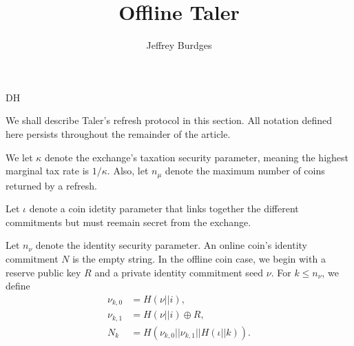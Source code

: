 \documentclass{llncs}
\title{Offline Taler}
\def\mathcomma{,}
\def\mathperiod{.}
\begin{document}
\mainmatter

\author{Jeffrey Burdges}


\maketitle







\def\Nu{N}
\def\newmathrm#1{\expandafter\newcommand\csname #1\endcsname{\mathrm{#1}}}
\newmathrm{FDH}


We shall describe Taler's refresh protocol in this section.
All notation defined here persists throughout the remainder of
 the article.

We let $\kappa$ denote the exchange's taxation security parameter,
meaning the highest marginal tax rate is $1/\kappa$.  Also, let 
$n_\mu$ denote the maximum number of coins returned by a refresh.

\smallskip

Let $\iota$ denote a coin idetity parameter that
 links together the different commitments but must reemain secret
 from the exchange. 

Let $n_\nu$ denote the identity security parameter.
An online coin's identity commitment $\Nu$ is the empty string.
In the offline coin case, we begin with a reserve public key $R$
and a private identity commitment seed $\nu$.  
For $k \le n_\nu$,  we define 
\[ \begin{aligned}
\nu_{k,0} &= H(\nu || i) \mathcomma \\
\nu_{k,1} &= H(\nu || i) \oplus R \mathcomma \\
\Nu_k &= H(\nu_{k,0} || \nu_{k,1} || H(\iota || k) ) \mathperiod \\
\end{aligned} \]

\smallskip
\end{document}
